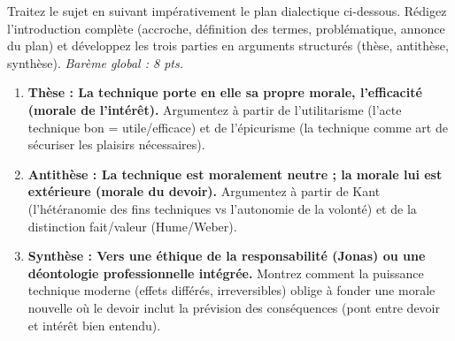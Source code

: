 \documentclass[11pt]{article}
\begin{document}
\begin{exercice}
Traitez le sujet en suivant impérativement le plan dialectique ci-dessous. Rédigez l'introduction complète (accroche, définition des termes, problématique, annonce du plan) et développez les trois parties en arguments structurés (thèse, antithèse, synthèse). \textit{Barème global : 8 pts.}
\begin{enumerate}
    \item \textbf{Thèse : La technique porte en elle sa propre morale, l'efficacité (morale de l'intérêt).} Argumentez à partir de l'utilitarisme (l'acte technique bon = utile/efficace) et de l'épicurisme (la technique comme art de sécuriser les plaisirs nécessaires).
    \item \textbf{Antithèse : La technique est moralement neutre ; la morale lui est extérieure (morale du devoir).} Argumentez à partir de Kant (l'hétéranomie des fins techniques vs l'autonomie de la volonté) et de la distinction fait/valeur (Hume/Weber).
    \item \textbf{Synthèse : Vers une éthique de la responsabilité (Jonas) ou une déontologie professionnelle intégrée.} Montrez comment la puissance technique moderne (effets différés, irreversibles) oblige à fonder une morale nouvelle où le devoir inclut la prévision des conséquences (pont entre devoir et intérêt bien entendu).
\end{enumerate}
\end{exercice}
\end{document}
